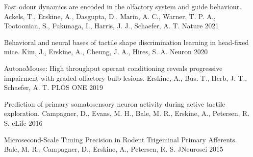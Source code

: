 
\begin{cvhonors}

  \cvhonor
    {Fast odour dynamics are encoded in the olfactory system and guide behaviour.} %
    {Ackels, T., Erskine, A., Dasgupta, D., Marin, A. C., Warner, T. P. A., Tootoonian, S., Fukunaga, I., Harris, J. J., Schaefer, A. T.} %
    {Nature} %
    {2021} %

  \cvhonor
    {Behavioral and neural bases of tactile shape discrimination learning in head-fixed mice.} %
    {Kim, J., Erskine, A., Cheung, J. A., Hires, S. A.} %
    {Neuron} %
    {2020} %

    \cvhonor
      {AutonoMouse: High throughput operant conditioning reveals progressive impairment with graded olfactory bulb lesions.} %
      {Erskine, A., Bus. T., Herb, J. T., Schaefer, A. T.} %
      {PLOS ONE} %
      {2019} %

  \cvhonor
    {Prediction of primary somatosensory neuron activity during active tactile exploration.} %
    {Campagner, D., Evans, M. H., Bale, M. R., Erskine, A., Petersen, R. S.} %
    {eLife} %
    {2016} %

  \cvhonor
    {Microsecond-Scale Timing Precision in Rodent Trigeminal Primary Afferents.} %
    {Bale, M. R., Campagner, D., Erskine, A., Petersen, R. S.} %
    {JNeurosci} %
    {2015} %

\end{cvhonors}